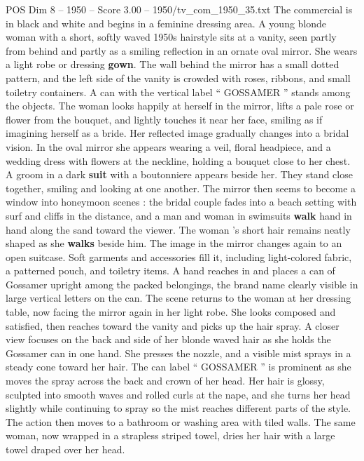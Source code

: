 \begin{textsample}{POS Dim 8 – 1950 – Score 3.00 – 1950/tv\_com\_1950\_35.txt}  \label{ex:f8_pos_080}
The commercial is in black and white and begins in a feminine dressing area.
A young blonde woman with a short, softly waved 1950s hairstyle sits at a vanity, seen partly from behind and partly as a smiling reflection in an ornate oval mirror.
She wears a light robe or dressing \textbf{gown}.
The wall behind the mirror has a small dotted pattern, and the left side of the vanity is crowded with roses, ribbons, and small toiletry containers.
A can with the vertical label “ GOSSAMER ” stands among the objects.
The woman looks happily at herself in the mirror, lifts a pale rose or flower from the bouquet, and lightly touches it near her face, smiling as if imagining herself as a bride.
Her reflected image gradually changes into a bridal vision.
In the oval mirror she appears wearing a veil, floral headpiece, and a wedding dress with flowers at the neckline, holding a bouquet close to her chest.
A groom in a dark \textbf{suit} with a boutonniere appears beside her.
They stand close together, smiling and looking at one another.
The mirror then seems to become a window into honeymoon scenes : the bridal couple fades into a beach setting with surf and cliffs in the distance, and a man and woman in swimsuits \textbf{walk} hand in hand along the sand toward the viewer.
The woman ’s short hair remains neatly shaped as she \textbf{walks} beside him.
The image in the mirror changes again to an open suitcase.
Soft garments and accessories fill it, including light-colored fabric, a patterned pouch, and toiletry items.
A hand reaches in and places a can of Gossamer upright among the packed belongings, the brand name clearly visible in large vertical letters on the can.
The scene returns to the woman at her dressing table, now facing the mirror again in her light robe.
She looks composed and satisfied, then reaches toward the vanity and picks up the hair spray.
A closer view focuses on the back and side of her blonde waved hair as she holds the Gossamer can in one hand.
She presses the nozzle, and a visible mist sprays in a steady cone toward her hair.
The can label “ GOSSAMER ” is prominent as she moves the spray across the back and crown of her head.
Her hair is glossy, sculpted into smooth waves and rolled curls at the nape, and she turns her head slightly while continuing to spray so the mist reaches different parts of the style.
The action then moves to a bathroom or washing area with tiled walls.
The same woman, now wrapped in a strapless striped towel, dries her hair with a large towel draped over her head.

\end{textsample}
